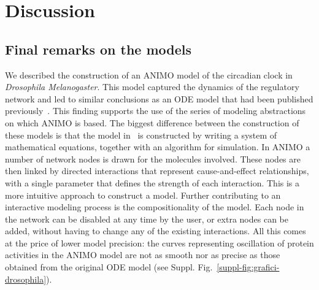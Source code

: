 \documentclass{bmcart}
\begin{document}
\section*{Discussion}
\subsection*{Final remarks on the models}
We described the construction of an ANIMO
model of the circadian clock in \emph{Drosophila Melanogaster}. This model
captured the dynamics of the regulatory network and led to similar
conclusions as an ODE model that had been
published previously~\cite{drosophila-ode-model}. This finding supports the use of
the series of modeling abstractions on which ANIMO is based. The biggest
difference between the construction of these models is that the model in~\cite{drosophila-ode-model}
is constructed by writing a system of mathematical equations, together
with an algorithm for simulation. In ANIMO a number of network
nodes is drawn for the molecules involved.
These nodes are then linked by directed
interactions that represent cause-and-effect relationships, with a single parameter
that defines the strength of each
interaction. This is a more intuitive approach to construct a model.
Further contributing to an interactive modeling process
is the compositionality of the model. Each node in the network
can be disabled at any time by the user, or extra nodes can be added,
without having to change any of the existing interactions.
All this comes at the price of lower model precision: the curves representing
oscillation of protein activities in the ANIMO model are not as smooth
nor as precise as those obtained from the original ODE model (see Suppl. Fig.~\ref{suppl-fig:grafici-drosophila}).
\end{document}
